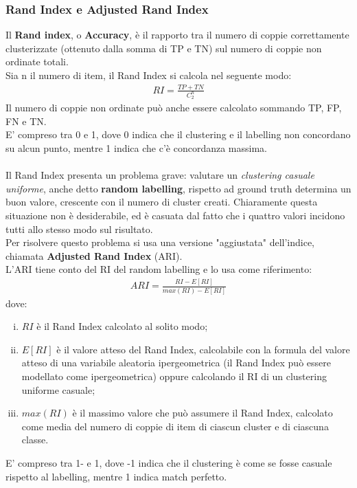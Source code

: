 \subsubsection{Rand Index e Adjusted Rand Index}
Il \textbf{Rand index}, o \textbf{Accuracy}, è il rapporto tra il numero di coppie correttamente clusterizzate (ottenuto dalla somma di TP e TN) sul numero di coppie non ordinate totali.\\
Sia n il numero di item, il Rand Index si calcola nel seguente modo:
\begin{align}
	RI = \frac{TP + TN}{C_2^n}
\end{align}
Il numero di coppie non ordinate può anche essere calcolato sommando TP, FP, FN e TN.\\
E' compreso tra 0 e 1, dove 0 indica che il clustering e il labelling non concordano su alcun punto, mentre 1 indica che c'è concordanza massima.\\
\\
Il Rand Index presenta un problema grave: valutare un \textit{clustering casuale uniforme}, anche detto \textbf{random labelling}, rispetto ad ground truth determina un buon valore, crescente con il numero di cluster creati. Chiaramente questa situazione non è desiderabile, ed è casuata dal fatto che i quattro valori incidono tutti allo stesso modo sul risultato.\\
Per risolvere questo problema si usa una versione "aggiustata" dell'indice, chiamata \textbf{Adjusted Rand Index} (ARI)\cite{ari}.\\
L'ARI tiene conto del RI del random labelling e lo usa come riferimento:
\begin{align}
	ARI = \frac{RI - E[RI]}{max(RI) - E[RI]}
\end{align}
dove:
\begin{enumerate}[(i)]
	\item $ RI $ è il Rand Index calcolato al solito modo;
	\item $ E[RI] $ è il valore atteso del Rand Index, calcolabile con la formula del valore atteso di una variabile aleatoria ipergeometrica (il Rand Index può essere modellato come ipergeometrica) oppure calcolando il RI di un clustering uniforme casuale;
	\item $ max(RI) $ è il massimo valore che può assumere il Rand Index, calcolato come media del numero di coppie di item di ciascun cluster e di ciascuna classe.
\end{enumerate}
E' compreso tra 1- e 1, dove -1 indica che il clustering è come se fosse casuale rispetto al labelling, mentre 1 indica match perfetto.\\

